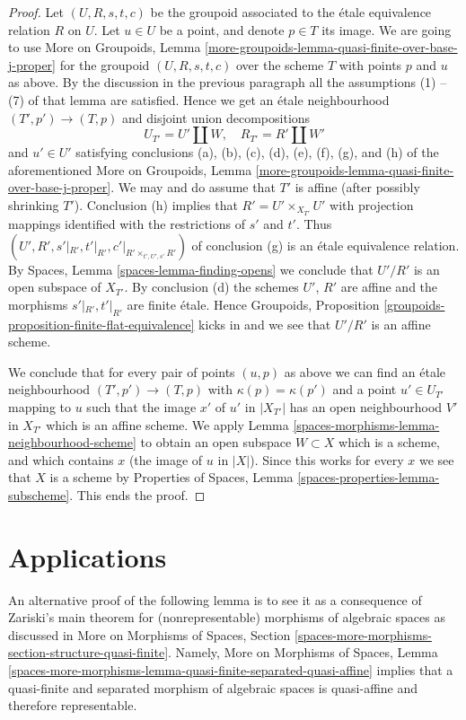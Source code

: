 \begin{proof}
\medskip\noindent
Let $(U, R, s, t, c)$ be the groupoid associated to the \'etale
equivalence relation $R$ on $U$. Let $u \in U$ be a point, and
denote $p \in T$ its image. We are going to use
More on Groupoids,
Lemma \ref{more-groupoids-lemma-quasi-finite-over-base-j-proper}
for the groupoid $(U, R, s, t, c)$ over the scheme $T$ with
points $p$ and $u$ as above.
By the discussion in the previous paragraph all the
assumptions (1) -- (7) of that lemma are satisfied.
Hence we get an \'etale neighbourhood
$(T', p') \to (T, p)$ and disjoint union decompositions
$$
U_{T'} = U' \amalg W, \quad
R_{T'} = R' \amalg W'
$$
and $u' \in U'$ satisfying conclusions
(a), (b), (c), (d), (e), (f), (g), and (h) of the aforementioned
More on Groupoids,
Lemma \ref{more-groupoids-lemma-quasi-finite-over-base-j-proper}.
We may and do assume that $T'$ is affine (after possibly shrinking $T'$).
Conclusion (h) implies that $R' = U' \times_{X_{T'}} U'$ with projection
mappings identified with the restrictions of $s'$ and $t'$.
Thus $(U', R', s'|_{R'}, t'|_{R'}, c'|_{R' \times_{t', U', s'} R'})$ of
conclusion (g) is an \'etale equivalence relation. By
Spaces, Lemma \ref{spaces-lemma-finding-opens}
we conclude that $U'/R'$ is an open subspace of $X_{T'}$. By conclusion (d)
the schemes $U'$, $R'$ are affine and the morphisms
$s'|_{R'}, t'|_{R'}$ are finite \'etale. Hence
Groupoids, Proposition \ref{groupoids-proposition-finite-flat-equivalence}
kicks in and we see that $U'/R'$ is an affine scheme.

\medskip\noindent
We conclude that for every pair of points $(u, p)$ as above we can
find an \'etale neighbourhood $(T', p') \to (T, p)$ with
$\kappa(p) = \kappa(p')$ and a point $u' \in U_{T'}$ mapping to $u$
such that the image $x'$ of $u'$ in $|X_{T'}|$ has an open neighbourhood
$V'$ in $X_{T'}$ which is an affine scheme. We apply
Lemma \ref{spaces-morphisms-lemma-neighbourhood-scheme}
to obtain an open subspace $W \subset X$ which is a scheme, and
which contains $x$ (the image of $u$ in $|X|$).
Since this works for every $x$ we see that $X$
is a scheme by
Properties of Spaces, Lemma \ref{spaces-properties-lemma-subscheme}.
This ends the proof.
\end{proof}

\section{Applications}
\label{spaces-morphisms-section-applications}
An alternative proof of the following lemma is to see it as a consequence
of Zariski's main theorem for (nonrepresentable) morphisms of algebraic spaces
as discussed in More on Morphisms of Spaces, Section
\ref{spaces-more-morphisms-section-structure-quasi-finite}.
Namely, More on Morphisms of Spaces, Lemma
\ref{spaces-more-morphisms-lemma-quasi-finite-separated-quasi-affine}
implies that a quasi-finite and separated morphism of algebraic spaces
is quasi-affine and therefore representable.

